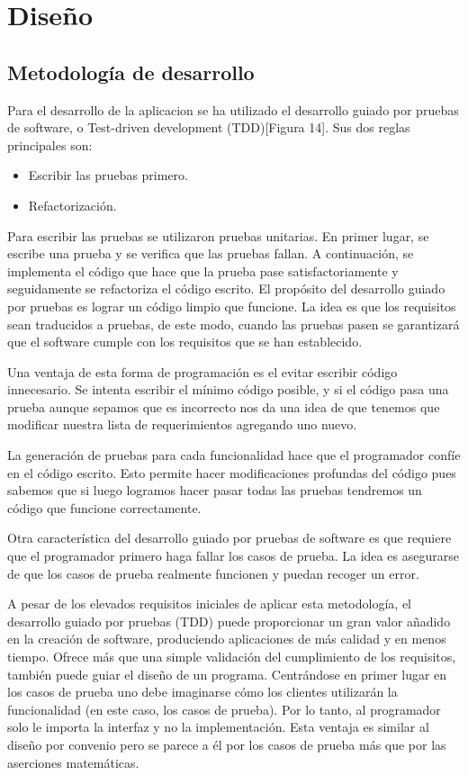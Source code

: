 \section{Diseño}
\label{section:diseno}

\subsection{Metodología de desarrollo}
\label{sec:metodologia_desarrollo}
Para el desarrollo de la aplicacion se ha utilizado el desarrollo guiado por pruebas de software, o Test-driven development (TDD)[Figura 14]. Sus dos reglas principales son:
\begin{itemize}
 \item Escribir las pruebas primero.
 \item Refactorización.
\end{itemize}

Para escribir las pruebas se utilizaron pruebas unitarias. En primer lugar, se escribe una prueba y se verifica que las pruebas fallan. A continuación, se implementa el código que hace que la prueba pase satisfactoriamente y seguidamente se refactoriza el código escrito. El propósito del desarrollo guiado por pruebas es lograr un código limpio que funcione. La idea es que los requisitos sean traducidos a pruebas, de este modo, cuando las pruebas pasen se garantizará que el software cumple con los requisitos que se han establecido.

Una ventaja de esta forma de programación es el evitar escribir código innecesario. Se intenta escribir el mínimo código posible, y si el código pasa una prueba aunque sepamos que es incorrecto nos da una idea de que tenemos que modificar nuestra lista de requerimientos agregando uno nuevo.

La generación de pruebas para cada funcionalidad hace que el programador confíe en el código escrito. Esto permite hacer modificaciones profundas del código pues sabemos que si luego logramos hacer pasar todas las pruebas tendremos un código que funcione correctamente.

Otra característica del desarrollo guiado por pruebas de software es que requiere que el programador primero haga fallar los casos de prueba. La idea es asegurarse de que los casos de prueba realmente funcionen y puedan recoger un error.

A pesar de los elevados requisitos iniciales de aplicar esta metodología, el desarrollo guiado por pruebas (TDD) puede proporcionar un gran valor añadido en la creación de software, produciendo aplicaciones de más calidad y en menos tiempo. Ofrece más que una simple validación del cumplimiento de los requisitos, también puede guiar el diseño de un programa. Centrándose en primer lugar en los casos de prueba uno debe imaginarse cómo los clientes utilizarán la funcionalidad (en este caso, los casos de prueba). Por lo tanto, al programador solo le importa la interfaz y no la implementación. Esta ventaja es similar al diseño por convenio pero se parece a él por los casos de prueba más que por las aserciones matemáticas.


